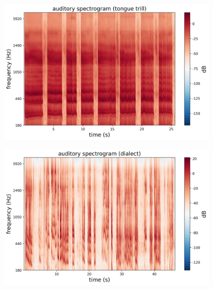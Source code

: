 \documentclass[jou,12pt,floatsintext]{apa7} %
\begin{document}
\begin{figure}[!htb]
    \centering
    \begin{minipage}{0.49\textwidth}
        \centering
        \subcaption{}
        \vspace{-0.5em}
        \includegraphics[width=\textwidth]{figure/tanshe.png}
        \label{spectrogram:tanshe}
    \end{minipage}
    \begin{minipage}{0.49\textwidth}
        \centering
        \subcaption{}
        \vspace{-0.5em}
        \includegraphics[width=\textwidth]{figure/dialect.png}
        \label{spectrogram:dialect}
    \end{minipage}
    
    \vspace{-2em} %
    

\end{figure}
\end{document}
